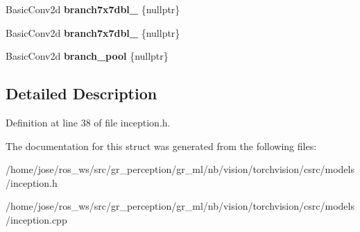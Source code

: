 \begin{DoxyCompactItemize}
Basic\+Conv2d {\bfseries branch7x7dbl\+\_} \{nullptr\}
\item 
\mbox{\label{structvision_1_1models_1_1__inceptionimpl_1_1InceptionCImpl_ae609aebade80ae176d6fdc4533fc2a55}} 
Basic\+Conv2d {\bfseries branch7x7dbl\+\_} \{nullptr\}
\item 
\mbox{\label{structvision_1_1models_1_1__inceptionimpl_1_1InceptionCImpl_a4f93e35b4266859b455ac6e5349ba13b}} 
Basic\+Conv2d {\bfseries branch\+\_\+pool} \{nullptr\}
\end{DoxyCompactItemize}


\subsection{Detailed Description}


Definition at line 38 of file inception.\+h.



The documentation for this struct was generated from the following files\+:\begin{DoxyCompactItemize}
\item 
/home/jose/ros\+\_\+ws/src/gr\+\_\+perception/gr\+\_\+ml/nb/vision/torchvision/csrc/models/inception.\+h\item 
/home/jose/ros\+\_\+ws/src/gr\+\_\+perception/gr\+\_\+ml/nb/vision/torchvision/csrc/models/inception.\+cpp\end{DoxyCompactItemize}
